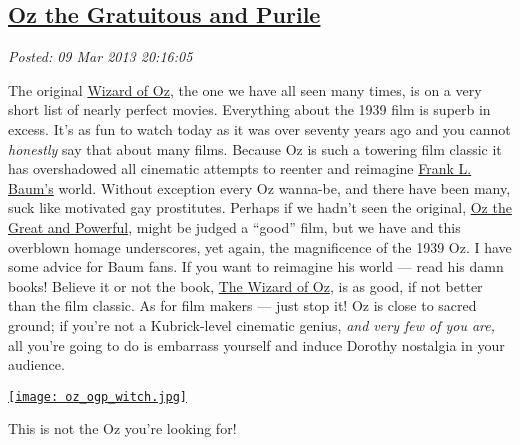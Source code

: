 %

\subsection*{\href{https://bakerjd99.wordpress.com/2013/03/09/oz-the-gratuitous-and-purile/}{Oz the Gratuitous and Purile}}


\noindent\emph{Posted: 09 Mar 2013 20:16:05}
\vspace{6pt}


\captionsetup[floatingfigure]{labelformat=empty}

The original
\href{http://www.rottentomatoes.com/m/1092277-wizard\_of\_oz/}{Wizard of
Oz}, the one we have all seen many times, is on a very short list of
nearly perfect movies. Everything about the 1939 film is superb in
excess. It's as fun to watch today as it was over seventy years ago and
you cannot \emph{honestly} say that about many films. Because Oz
is such a towering film classic it has overshadowed all cinematic attempts to
reenter and reimagine \href{http://www.online-literature.com/baum/}{Frank L. Baum's} world.
Without exception every Oz wanna-be, and there have been many, suck like
motivated gay prostitutes. Perhaps if we hadn't seen the original,
\href{http://disney.go.com/thewizard/}{Oz the Great and Powerful}, might
be judged a ``good'' film, but we have and this overblown
homage underscores, yet again, the magnificence of the 1939 Oz. I have
some advice for Baum fans. If you want to reimagine his world --- read
his damn books! Believe it or not the book,
\href{http://www.booksshouldbefree.com/book/the-wonderful-wizard-of-oz}{The
Wizard of Oz}, is as good, if not better than the film classic. As for
film makers --- just stop it! Oz is close to sacred ground; if you're
not a Kubrick-level cinematic genius, \emph{and very few of you are,}
all you're going to do is embarrass yourself and induce Dorothy
nostalgia in your audience.
\begin{floatingfigure}[r]{0.39\textwidth}
\centering
\href{http://screencrush.com/oz-the-great-and-powerful-poster-wicked-witch-2/}{\texttt{[image: oz\_ogp\_witch.jpg]}}
\caption{This is not the Oz you're looking for!}
\label{fig:3815X0}
\end{floatingfigure}


